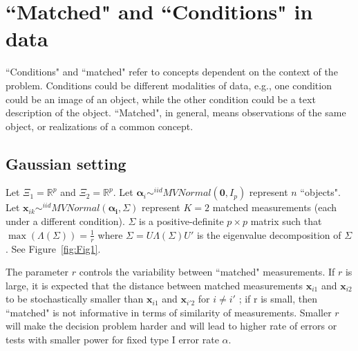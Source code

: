 \documentclass[11pt]{article} %
\begin{document}

 

\section{``Matched" and ``Conditions" in data}

 ``Conditions" and ``matched" refer to concepts dependent on the context of the  problem. Conditions could be different modalities of data, e.g., one condition could be  an image of an object, while the other condition could be a text description of the object. ``Matched", in general, means observations of the same object, or realizations of a common concept. 
\subsection{Gaussian setting\label{subsec:GaussianSet}}
	Let    $\Xi_1 = \mathbb{R}^{p}$ and $\Xi_2 = \mathbb{R}^{p}$.
  Let $\bm{\alpha}_i \sim^{iid} MVNormal(\bm{0},I_p)$ represent $n$ ``objects".  Let $\bm{x}_{ik}  \sim^{iid} MVNormal(\bm{\alpha_i},\Sigma)$ represent $K=2$ matched measurements (each under a different condition).
  $\Sigma$ is a positive-definite $p\times p$ matrix such that  $\max(\Lambda(\Sigma))=\frac{1}{r} $ where $\Sigma=U\Lambda(\Sigma)U'$  is the eigenvalue decomposition of $\Sigma$. See Figure~\ref{fig:Fig1}.

The parameter $r$ controls the variability between ``matched" measurements. If $r$ is large, it is expected that the distance between matched measurements
$\bm{x}_{i1}$ and $\bm{x}_{i2}$ to be stochastically smaller than $\bm{x}_{i1}$ and $\bm{x}_{i'2}$ for $i \neq i'$ ; if r is small, then ``matched" is not informative in terms of similarity of measurements.
 Smaller $r$ will make the decision problem harder and will lead to higher rate of errors or tests with smaller power for fixed type I error rate $\alpha$.
\end{document}
